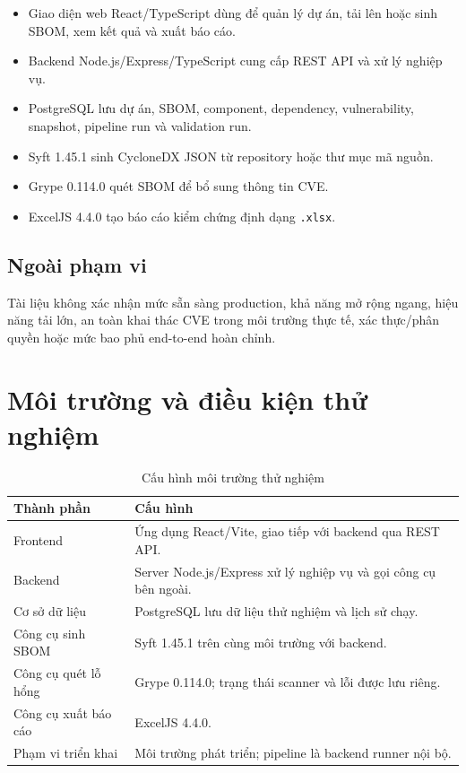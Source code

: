 \documentclass[12pt,a4paper]{article}
\newcommand{\code}[1]{\texttt{#1}}
\begin{document}
\begin{itemize}
  \item Giao diện web React/TypeScript dùng để quản lý dự án, tải lên hoặc sinh SBOM,
        xem kết quả và xuất báo cáo.
  \item Backend Node.js/Express/TypeScript cung cấp REST API và xử lý nghiệp vụ.
  \item PostgreSQL lưu dự án, SBOM, component, dependency, vulnerability, snapshot,
        pipeline run và validation run.
  \item Syft 1.45.1 sinh CycloneDX JSON từ repository hoặc thư mục mã nguồn.
  \item Grype 0.114.0 quét SBOM để bổ sung thông tin CVE.
  \item ExcelJS 4.4.0 tạo báo cáo kiểm chứng định dạng \code{.xlsx}.
\end{itemize}

\subsection{Ngoài phạm vi}

Tài liệu không xác nhận mức sẵn sàng production, khả năng mở rộng ngang, hiệu năng tải
lớn, an toàn khai thác CVE trong môi trường thực tế, xác thực/phân quyền hoặc mức bao
phủ end-to-end hoàn chỉnh.

\section{Môi trường và điều kiện thử nghiệm}

\begin{table}[H]
  \centering
  \caption{Cấu hình môi trường thử nghiệm}
  \begin{tabularx}{\textwidth}{|L{3.7cm}|Y|}
    \hline
    \textbf{Thành phần} & \textbf{Cấu hình} \\ \hline
    Frontend & Ứng dụng React/Vite, giao tiếp với backend qua REST API. \\ \hline
    Backend & Server Node.js/Express xử lý nghiệp vụ và gọi công cụ bên ngoài. \\ \hline
    Cơ sở dữ liệu & PostgreSQL lưu dữ liệu thử nghiệm và lịch sử chạy. \\ \hline
    Công cụ sinh SBOM & Syft 1.45.1 trên cùng môi trường với backend. \\ \hline
    Công cụ quét lỗ hổng & Grype 0.114.0; trạng thái scanner và lỗi được lưu riêng. \\ \hline
    Công cụ xuất báo cáo & ExcelJS 4.4.0. \\ \hline
    Phạm vi triển khai & Môi trường phát triển; pipeline là backend runner nội bộ. \\ \hline
  \end{tabularx}
\end{table}
\end{document}
